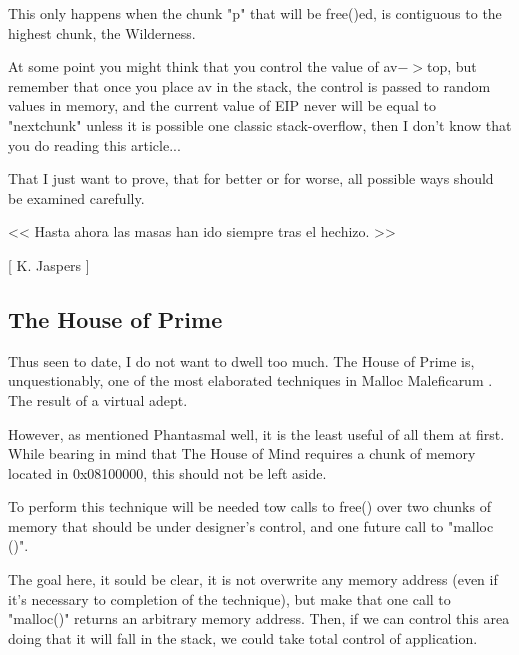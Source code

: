 \documentclass[12pt]{article}
\begin{document}
This only happens when the chunk "p" that will be free()ed, is contiguous
to the highest chunk, the Wilderness.
\newline


At some point you might think that you control the value of av$->$top, but
remember that once you place av in the stack, the control is passed to
random values in memory, and the current value of EIP never will be equal
to "nextchunk" unless it is possible one classic stack-overflow, then I
don't know that you do reading this article...
\newline


That I just want to prove, that for better or for worse, all possible ways
should be examined carefully.


\begin{verbnobox}[\small]
                    << Hasta ahora las masas han ido
                       siempre tras el hechizo. >>

                                      [ K. Jaspers ]
\end{verbnobox}

\subsection{The House of Prime}

Thus seen to date, I do not want to dwell too much. The House of Prime is,
unquestionably, one of the most elaborated techniques in Malloc
Maleficarum . The result of a virtual adept.
\newline


However, as mentioned Phantasmal well, it is the least useful of all them
at first. While bearing in mind that The House of Mind requires a chunk of
memory located in 0x08100000, this should not be left aside.
\newline


To perform this technique will be needed tow calls to free() over two
chunks of memory that should be under designer's control, and one future
call to "malloc ()".
\newline


The goal here, it sould be clear, it is not overwrite any memory address
(even if it's necessary to completion of the technique), but make that
one call to "malloc()" returns an arbitrary memory address. Then, if we
can control this area doing that it will fall in the stack, we could take
total control of application.
\newline
\end{document}
